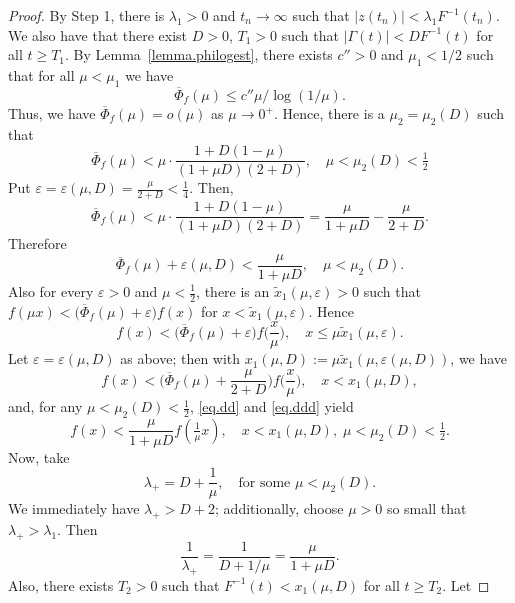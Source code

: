 \documentclass[a4paper,10pt,reqno]{amsart}
\numberwithin{equation}{section}
\theoremstyle{definition}
\theoremstyle{remark}
\DeclareMathOperator{\1}{\mathbbm 1}
\begin{document}
\begin{proof}
		By Step 1, there is $\lambda_1 > 0$ and $t_n \to \infty$ such that
		$|z(t_n)| < \lambda_1 F^{-1}(t_n)$. We also have that there exist $D>0$, $T_1>0$ such that
		$|\Gamma(t)| < D F^{-1}(t)$ for all $t \geq T_1$. 
		By Lemma~\ref{lemma.philogest}, there exists $c''>0$ and $\mu_1<1/2$ such that for all $\mu<\mu_1$ we have 
		$$\overline{\Phi}_f(\mu)\leq c''\mu/\log(1/\mu).$$ 
		Thus,
		we have $\overline{\Phi}_f(\mu) = o(\mu)$ as $\mu \to 0^+$.
		Hence, there is a $\mu_2 = \mu_2(D)$ such that			
		\[
		\overline{\Phi}_f(\mu) < \mu \cdot \frac{1 + D (1-\mu)}{(1+\mu D)(2+D)}, 
		\quad \mu < \mu_2(D) < \tfrac{1}{2}			
		\]	
		Put $\varepsilon = \varepsilon(\mu,D) = \frac{\mu}{2+D} < \tfrac{1}{4}$. Then,
		\[
		\overline{\Phi}_f(\mu) < \mu \cdot \frac{1 + D(1-\mu)}{(1+\mu D)(2+D)} 
		= \frac{\mu}{1+\mu D} - \frac{\mu}{2+D}.
		\]	
		Therefore
		\begin{equation} \label{eq.dd}
			\overline{\Phi}_f(\mu)+ \varepsilon(\mu,D) < \frac{\mu}{1+\mu D}, \quad \mu < \mu_2(D).
		\end{equation}
		Also for every $\varepsilon>0$ and $\mu < \tfrac{1}{2}$, there is an 
		$\tilde{x}_1(\mu,\varepsilon) > 0$ such that
		$
		f(\mu x) < \big(	\overline{\Phi}_f(\mu) + \varepsilon \big) f(x)$ for $x < \tilde{x}_1(\mu,\varepsilon)$. Hence 
		\[
		f(x) < \big(	\overline{\Phi}_f(\mu) + \varepsilon\big) f\!\Big(\frac{x}{\mu}\Big),
		\quad x \leq \mu \tilde{x}_1(\mu,\varepsilon).
		\]
		Let $\varepsilon = \varepsilon(\mu,D)$ as above; then with
		$x_1(\mu,D) := \mu \tilde{x}_1(\mu,\varepsilon(\mu,D))$, we have
		\begin{equation} \label{eq.ddd}
			f(x) < \Big(	\overline{\Phi}_f(\mu) + \frac{\mu}{2+D}\Big) f\!\Big(\frac{x}{\mu}\Big), 
			\quad x < x_1(\mu,D), 
		\end{equation}
		and, for any $\mu < \mu_2(D) < \tfrac{1}{2}$, \eqref{eq.dd} and \eqref{eq.ddd} yield 
		\begin{equation} \label{IV}
			f(x) < \frac{\mu}{1 + \mu D} f\!\left(\tfrac{1}{\mu}x\right), 
			\quad x < x_1(\mu,D), \; \mu < \mu_2(D) < \tfrac{1}{2}. 
		\end{equation}
		Now, take  
		\[
		\lambda_+ = D + \frac{1}{\mu}, 
		\quad \text{for some } \mu < \mu_2(D).
		\]
		We immediately have $\lambda_+ > D+2$; additionally, choose $\mu>0$ so small that $\lambda_+ > \lambda_1$. 
		Then
		\begin{equation} \label{III}
			\frac{1}{\lambda_+} = \frac{1}{D+1/\mu} = \frac{\mu}{1+\mu D}. 
		\end{equation}
		Also, there exists $T_2 > 0$ such that $F^{-1}(t) < x_1(\mu,D)$ for all $t \geq T_2$. Let 

\end{proof}
\end{document}
